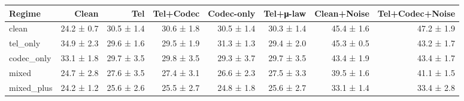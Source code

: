 \begin{tabular}{lrrrrrrr}
\toprule
Regime & Clean & Tel & Tel+Codec & Codec-only & Tel+μ-law & Clean+Noise & Tel+Codec+Noise \\
\midrule
clean & 24.2 ± 0.7 & 30.5 ± 1.4 & 30.6 ± 1.8 & 30.5 ± 1.4 & 30.3 ± 1.4 & 45.4 ± 1.6 & 47.2 ± 1.9 \\
tel_only & 34.9 ± 2.3 & 29.6 ± 1.6 & 29.5 ± 1.9 & 31.3 ± 1.3 & 29.4 ± 2.0 & 45.3 ± 0.5 & 43.2 ± 1.7 \\
codec_only & 33.1 ± 1.8 & 29.7 ± 3.5 & 29.8 ± 3.5 & 29.3 ± 3.7 & 29.7 ± 3.5 & 43.4 ± 1.9 & 43.4 ± 1.7 \\
mixed & 24.7 ± 2.8 & 27.6 ± 3.5 & 27.4 ± 3.1 & 26.6 ± 2.3 & 27.5 ± 3.3 & 39.5 ± 1.6 & 41.1 ± 1.5 \\
mixed_plus & 24.2 ± 1.2 & 25.6 ± 2.6 & 25.5 ± 2.7 & 24.8 ± 1.8 & 25.6 ± 2.7 & 33.1 ± 1.4 & 33.4 ± 2.8 \\
\bottomrule
\end{tabular}